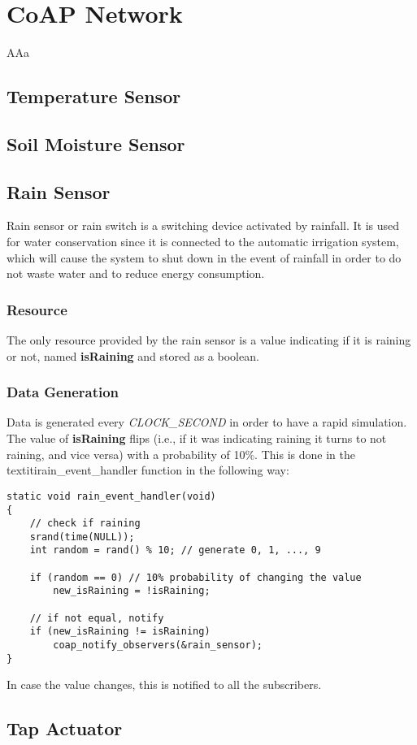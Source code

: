 \section{CoAP Network}
AAa

\subsection{Temperature Sensor}

\subsection{Soil Moisture Sensor}

\subsection{Rain Sensor}
Rain sensor or rain switch is a switching device activated by rainfall. It is used for water conservation since it is connected to the automatic irrigation system, which will cause the system to shut down in the event of rainfall in order to do not waste water and to reduce energy consumption.

\subsubsection{Resource}
The only resource provided by the rain sensor is a value indicating if it is raining or not, named \textbf{isRaining} and stored as a boolean.

\subsubsection{Data Generation}
Data is generated every \textit{CLOCK\_SECOND} in order to have a rapid simulation. The value of \textbf{isRaining} flips (i.e., if it was indicating raining it turns to not raining, and vice versa) with a probability of 10\%. This is done in the textiti{rain\_event\_handler} function in the following way:

\begin{lstlisting}
static void rain_event_handler(void)
{
    // check if raining
    srand(time(NULL));
    int random = rand() % 10; // generate 0, 1, ..., 9
    
    if (random == 0) // 10% probability of changing the value
        new_isRaining = !isRaining;

    // if not equal, notify
    if (new_isRaining != isRaining)
        coap_notify_observers(&rain_sensor);
}
\end{lstlisting}

In case the value changes, this is notified to all the subscribers.

\subsection{Tap Actuator}
